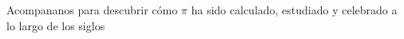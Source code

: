 \documentclass[preview]{standalone}
\begin{document}
\begin{center}
Acompananos para descubrir cómo $\pi$ ha sido calculado, estudiado y celebrado a lo largo de los siglos
\end{center}
\end{document}
